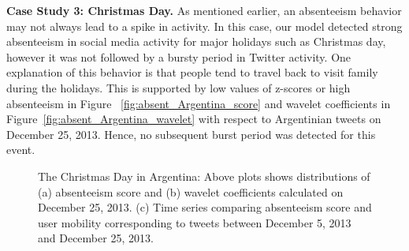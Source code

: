 \textbf{Case Study 3: Christmas Day.}
As mentioned earlier, an absenteeism behavior may not always lead to a spike in activity. In this case, our model detected strong absenteeism in social media activity for major holidays such as Christmas day, however it was not followed by a bursty period in Twitter activity. One explanation of this behavior is that people tend to travel back to visit family during the holidays. This is supported by low values of z-scores or high absenteeism in Figure~ \ref{fig:absent_Argentina_score} and wavelet coefficients in Figure~\ref{fig:absent_Argentina_wavelet} with respect to Argentinian tweets on December 25, 2013. Hence, no subsequent burst period was detected for this event.

\begin{figure}[t]
	\centering
	\caption{The Christmas Day in Argentina: Above plots shows distributions of (a) absenteeism score and (b) wavelet coefficients calculated on December 25, 2013. (c) Time series comparing absenteeism score and user mobility corresponding to tweets between December 5, 2013 and December 25, 2013.}
\vspace{-2mm}
\label{fig:case3_wavelet}
\end{figure}



